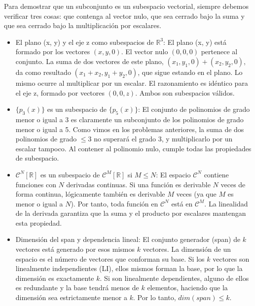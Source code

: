 \documentclass[11pt,spanish]{article}
\newcounter{problema}
\begin{document}
Para demostrar que un subconjunto es un subespacio vectorial, siempre debemos verificar tres cosas: que contenga al vector nulo, que sea cerrado bajo la suma y que sea cerrado bajo la multiplicación por escalares.

\begin{itemize}
\item[a)] El plano (x, y) y el eje z como subespacios de $\mathbb{R}^{3}$:
El plano (x, y) está formado por los vectores $(x, y, 0)$. El vector nulo $(0, 0, 0)$ pertenece al conjunto. La suma de dos vectores de este plano, $(x_{1}, y_{1}, 0) + (x_{2}, y_{2}, 0)$, da como resultado $(x_{1}+x_{2}, y_{1}+y_{2}, 0)$, que sigue estando en el plano. Lo mismo ocurre al multiplicar por un escalar. El razonamiento es idéntico para el eje z, formado por vectores $(0, 0, z)$. Ambos son subespacios válidos.


\item[b)] $\{p_{3}(x)\}$ es un subespacio de $\{p_{5}(x)\}$:
El conjunto de polinomios de grado menor o igual a 3 es claramente un subconjunto de los polinomios de grado menor o igual a 5. Como vimos en los problemas anteriores, la suma de dos polinomios de grado $\le 3$ no superará el grado 3, y multiplicarlo por un escalar tampoco. Al contener al polinomio nulo, cumple todas las propiedades de subespacio.

\item[c)] $\mathcal{C}^{N}[\mathbb{R}]$ es un subespacio de $\mathcal{C}^{M}[\mathbb{R}]$ si $M\le N$:
El espacio $\mathcal{C}^{N}$ contiene funciones con $N$ derivadas continuas. Si una función es derivable $N$ veces de forma continua, lógicamente también es derivable $M$ veces (ya que $M$ es menor o igual a $N$). Por tanto, toda función en $\mathcal{C}^{N}$ está en $\mathcal{C}^{M}$. La linealidad de la derivada garantiza que la suma y el producto por escalares mantengan esta propiedad.

\item[d)] Dimensión del span y dependencia lineal:
El conjunto generador (span) de $k$ vectores está generado por esos mismos $k$ vectores. La dimensión de un espacio es el número de vectores que conforman su base. Si los $k$ vectores son linealmente independientes (LI), ellos mismos forman la base, por lo que la dimensión es exactamente $k$. Si son linealmente dependientes, alguno de ellos es redundante y la base tendrá menos de $k$ elementos, haciendo que la dimensión sea estrictamente menor a $k$. Por lo tanto, $dim(span) \le k$.
\end{itemize}
\end{document}
